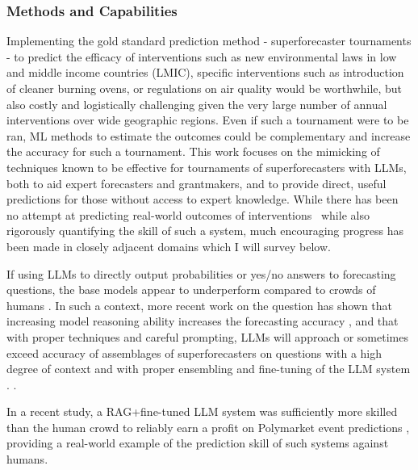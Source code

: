 \documentclass[12pt,a4paper]{article}
\begin{document}

\subsubsection{Methods and Capabilities}
Implementing the gold standard prediction method - superforecaster tournaments - to predict the efficacy of interventions such as new environmental laws in low and middle income countries (LMIC), specific interventions such as introduction of cleaner burning ovens, or regulations on air quality would be worthwhile, but also costly and logistically challenging given the very large number of annual interventions over wide geographic regions. Even if such a tournament were to be ran, ML methods to estimate the outcomes could be complementary and increase the accuracy for such a tournament. This work focuses on the mimicking of techniques known to be effective for tournaments of superforecasters with LLMs, both to aid expert forecasters and grantmakers, and to provide direct, useful predictions for those without access to expert knowledge. While there has been no attempt at predicting real-world outcomes of interventions \ABSTRACT\ while also rigorously quantifying the skill of such a system, much encouraging progress has been made in closely adjacent domains which I will survey below.

If using LLMs to directly output probabilities or yes/no answers to forecasting questions, the base models appear to underperform compared to crowds of humans  . In such a context, more recent work on the question has shown that increasing model reasoning ability increases the forecasting accuracy , and that with proper techniques and careful prompting, LLMs will approach or sometimes exceed accuracy of assemblages of superforecasters on questions with a high degree of context and with proper ensembling and fine-tuning of the LLM system .   . 

In a recent study, a RAG+fine-tuned LLM system was sufficiently more skilled than the human crowd to reliably earn a profit on Polymarket event predictions , providing a real-world example of the prediction skill of such systems against humans.
\end{document}

